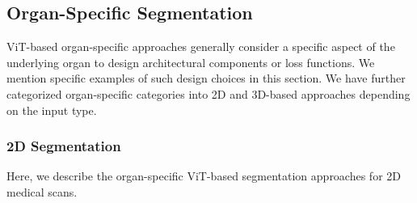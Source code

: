 \documentclass[10pt,journal,compsoc]{IEEEtran}
\begin{document}
\subsection{Organ-Specific Segmentation}

ViT-based organ-specific approaches generally consider a specific aspect of the underlying organ to design architectural components or loss functions. We mention specific examples of such design choices in this section. We have further categorized organ-specific categories into 2D and 3D-based approaches depending on the input type. 
\subsubsection{\textbf{2D Segmentation}} Here, we describe the organ-specific ViT-based segmentation approaches for 2D medical scans.
\end{document}
